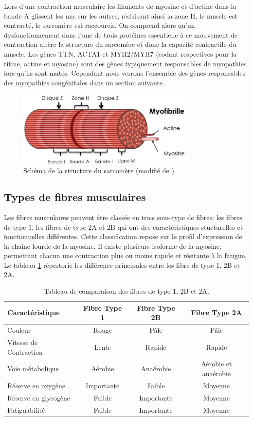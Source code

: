 Lors d'une contraction musculaire les filaments de myosine et d'actine dans la bande A glissent les uns sur les autres, réduisant ainsi la zone H, le muscle est contracté, le sarcomère est raccourcis. On comprend alors qu'un dysfonctionnement dans l'une de trois protéines essentielle à ce mouvement de contraction altère la structure du sarcomère et donc la capacité contractile du muscle. Les gènes TTN, ACTA1 et MYH2/MYH7 (codant respectives pour la titine, actine et myosine) sont des gènes typiquement responsables de myopathies lors qu'ils sont mutés. Cependant nous verrons l'ensemble des gènes responsables des myopathies congénitales dans un section suivante.
\begin{figure}[!htbp]
 \centering
 \includegraphics[width=0.8\textwidth]{figures/sarcomere.png}
 \caption[Schéma de la structure du sarcomère.]{Schéma de la structure du sarcomère (modifié de \cite{burr_basic_2019}).}
 \label{fig:sarcomere}
\end{figure}

\subsection{Types de fibres musculaires}
Les fibres musculaires peuvent être classée en trois sous-type de fibres: les fibres de type 1, les fibres de type 2A et 2B qui ont des caractéristiques stucturelles et fonctionnelles différentes. Cette classification repose sur le profil d'expression de la chaine lourde de la myosine. Il existe plusieurs isoforme de la myosine, permettant chacun une contraction plus ou moins rapide et résitante à la fatigue. Le tableau \ref{table:fiber-compare} répertorie les différence principales entre les fibre de type 1, 2B et 2A.

\begin{table}[!htbp]
\centering
\begin{tabular}{|l|c|c|c|} 
 \hline
 \textbf{Caractéristique} & \textbf{Fibre Type 1} & \textbf{Fibre Type 2B}  & \textbf{Fibre Type 2A} \\
 \hline
Couleur & Rouge & Pâle & Pâle \\
Vitesse de Contraction & Lente & Rapide & Rapide \\
Voie métabolique & Aérobie & Anaérobie & Aérobie et anaérobie \\
Réserve en oxygène & Importante & Faible & Moyenne \\
Réserve en glycogène & Faible & Importante & Moyenne \\
Fatiguabilité & Faible & Importante & Moyenne \\
 \hline
\end{tabular}
\caption{Tableau de comparaison des fibres de type 1, 2B et 2A.}
\label{table:fiber-compare}
\end{table}

